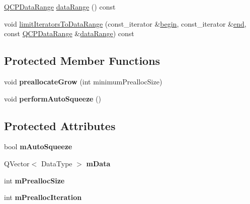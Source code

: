 \begin{DoxyCompactItemize}
\item 
\mbox{\hyperlink{class_q_c_p_data_range}{Q\+C\+P\+Data\+Range}} \mbox{\hyperlink{class_q_c_p_data_container_aece90eeb2ba8d3c46d3d94023630fbc7}{data\+Range}} () const
\item 
void \mbox{\hyperlink{class_q_c_p_data_container_aa1b36f5ae86a5a5a0b92141d3a0945c4}{limit\+Iterators\+To\+Data\+Range}} (const\+\_\+iterator \&\mbox{\hyperlink{class_q_c_p_data_container_a80032518413ab8f418f7c81182fd06cb}{begin}}, const\+\_\+iterator \&\mbox{\hyperlink{class_q_c_p_data_container_acf66dfad83fe041380f5e0491e7676f2}{end}}, const \mbox{\hyperlink{class_q_c_p_data_range}{Q\+C\+P\+Data\+Range}} \&\mbox{\hyperlink{class_q_c_p_data_container_aece90eeb2ba8d3c46d3d94023630fbc7}{data\+Range}}) const
\end{DoxyCompactItemize}
\subsection*{Protected Member Functions}
\begin{DoxyCompactItemize}
\item 
\mbox{\label{class_q_c_p_data_container_aae8cdb2bcc3b900ec22f26df3e7d67c7}} 
void {\bfseries preallocate\+Grow} (int minimum\+Prealloc\+Size)
\item 
\mbox{\label{class_q_c_p_data_container_a83c25ac14be1c920df85e797ee75c982}} 
void {\bfseries perform\+Auto\+Squeeze} ()
\end{DoxyCompactItemize}
\subsection*{Protected Attributes}
\begin{DoxyCompactItemize}
\item 
\mbox{\label{class_q_c_p_data_container_aae64c517d64511ad7a81ff8ee7b29147}} 
bool {\bfseries m\+Auto\+Squeeze}
\item 
\mbox{\label{class_q_c_p_data_container_a74906b4da829849c4062b5337c72585d}} 
Q\+Vector$<$ Data\+Type $>$ {\bfseries m\+Data}
\item 
\mbox{\label{class_q_c_p_data_container_a3554d3ad00e69f7ce057efa00ea6f4b2}} 
int {\bfseries m\+Prealloc\+Size}
\item 
\mbox{\label{class_q_c_p_data_container_ab2115bf023c29691f441eaf1889de84a}} 
int {\bfseries m\+Prealloc\+Iteration}
\end{DoxyCompactItemize}
